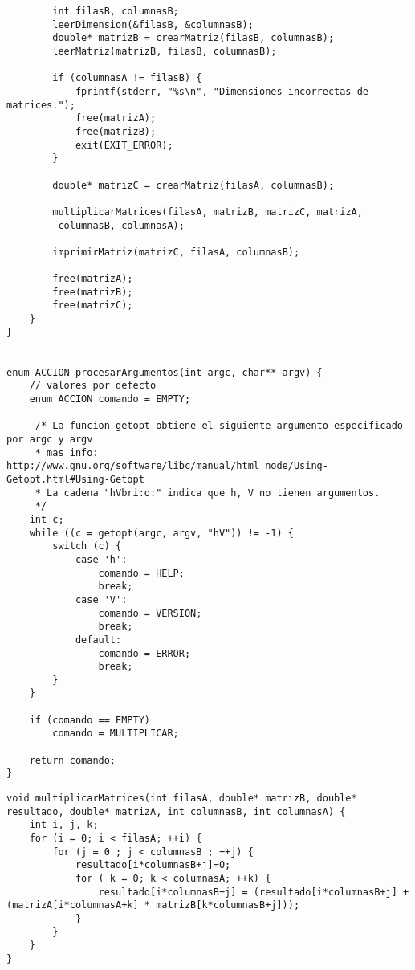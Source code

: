 \documentclass[a4paper,10pt]{article}
\begin{document}
\begin{lstlisting}
		int filasB, columnasB;
		leerDimension(&filasB, &columnasB);
		double* matrizB = crearMatriz(filasB, columnasB);
		leerMatriz(matrizB, filasB, columnasB);

		if (columnasA != filasB) {
			fprintf(stderr, "%s\n", "Dimensiones incorrectas de matrices.");
			free(matrizA);
			free(matrizB);
			exit(EXIT_ERROR);
		}

		double* matrizC = crearMatriz(filasA, columnasB);
		
		multiplicarMatrices(filasA, matrizB, matrizC, matrizA, 
		 columnasB, columnasA);
		
		imprimirMatriz(matrizC, filasA, columnasB);

		free(matrizA);
		free(matrizB);
		free(matrizC);
	}
}


enum ACCION procesarArgumentos(int argc, char** argv) {
	// valores por defecto
	enum ACCION comando = EMPTY;
	
	 /* La funcion getopt obtiene el siguiente argumento especificado por argc y argv
	 * mas info: http://www.gnu.org/software/libc/manual/html_node/Using-Getopt.html#Using-Getopt
	 * La cadena "hVbri:o:" indica que h, V no tienen argumentos.
	 */
	int c;
	while ((c = getopt(argc, argv, "hV")) != -1) {
		switch (c) {
			case 'h':
				comando = HELP;
				break;
			case 'V':
				comando = VERSION;
				break;
			default:
				comando = ERROR;
				break;
		}
	}

	if (comando == EMPTY)
		comando = MULTIPLICAR;

	return comando;
}
\end{lstlisting}
\pagebreak
\begin{lstlisting}
void multiplicarMatrices(int filasA, double* matrizB, double* resultado, double* matrizA, int columnasB, int columnasA) {
	int i, j, k;
	for (i = 0; i < filasA; ++i) {
	  	for (j = 0 ; j < columnasB ; ++j) {
	  		resultado[i*columnasB+j]=0;
	      	for ( k = 0; k < columnasA; ++k) {
	      		resultado[i*columnasB+j] = (resultado[i*columnasB+j] + (matrizA[i*columnasA+k] * matrizB[k*columnasB+j]));
	    	}
		}
	}
}
\end{lstlisting}
\pagebreak
\end{document}
